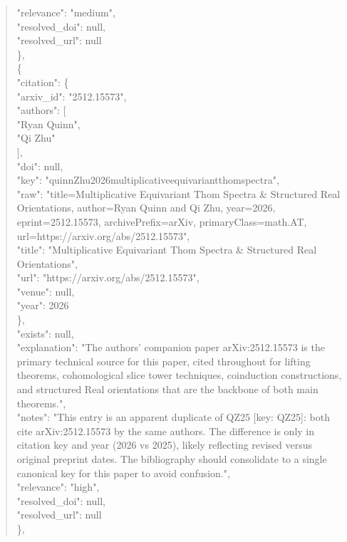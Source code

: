 \documentclass[11pt]{article}
\begin{document}
\begin{quote}
      "relevance": "medium",\\
      "resolved\_doi": null,\\
      "resolved\_url": null\\
    \},\\
    \{\\
      "citation": \{\\
        "arxiv\_id": "2512.15573",\\
        "authors": [\\
          "Ryan Quinn",\\
          "Qi Zhu"\\
        ],\\
        "doi": null,\\
        "key": "quinnZhu2026multiplicativeequivariantthomspectra",\\
        "raw": "title=Multiplicative Equivariant Thom Spectra \& Structured Real Orientations, author=Ryan Quinn and Qi Zhu, year=2026, eprint=2512.15573, archivePrefix=arXiv, primaryClass=math.AT, url=https://arxiv.org/abs/2512.15573",\\
        "title": "Multiplicative Equivariant Thom Spectra \& Structured Real Orientations",\\
        "url": "https://arxiv.org/abs/2512.15573",\\
        "venue": null,\\
        "year": 2026\\
      \},\\
      "exists": null,\\
      "explanation": "The authors' companion paper arXiv:2512.15573 is the primary technical source for this paper, cited throughout for lifting theorems, cohomological slice tower techniques, coinduction constructions, and structured Real orientations that are the backbone of both main theorems.",\\
      "notes": "This entry is an apparent duplicate of QZ25 [key: QZ25]: both cite arXiv:2512.15573 by the same authors. The difference is only in citation key and year (2026 vs 2025), likely reflecting revised versus original preprint dates. The bibliography should consolidate to a single canonical key for this paper to avoid confusion.",\\
      "relevance": "high",\\
      "resolved\_doi": null,\\
      "resolved\_url": null\\
    \},\\

\end{quote}
\end{document}
